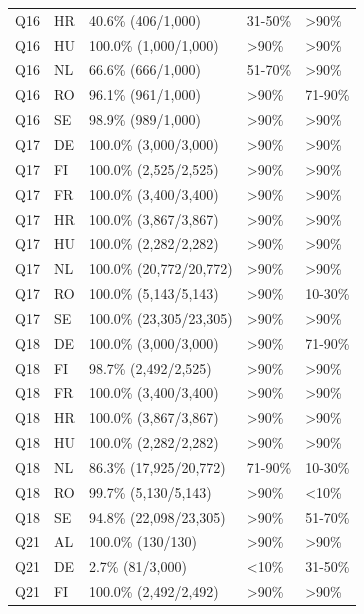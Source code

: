 {\begin{longtable}[]{@{}
  L{0.1274}
  L{0.1177}
  L{0.3333}
  L{0.1470}
  L{0.2745}@{}}
Q16 & HR & 40.6\% (406/1,000) & 31-50\% & \textgreater90\% \\
Q16 & HU & 100.0\% (1,000/1,000) & \textgreater90\% & \textgreater90\% \\
Q16 & NL & 66.6\% (666/1,000) & 51-70\% & \textgreater90\% \\
Q16 & RO & 96.1\% (961/1,000) & \textgreater90\% & 71-90\% \\
Q16 & SE & 98.9\% (989/1,000) & \textgreater90\% & \textgreater90\% \\
Q17 & DE & 100.0\% (3,000/3,000) & \textgreater90\% & \textgreater90\% \\
Q17 & FI & 100.0\% (2,525/2,525) & \textgreater90\% & \textgreater90\% \\
Q17 & FR & 100.0\% (3,400/3,400) & \textgreater90\% & \textgreater90\% \\
Q17 & HR & 100.0\% (3,867/3,867) & \textgreater90\% & \textgreater90\% \\
Q17 & HU & 100.0\% (2,282/2,282) & \textgreater90\% & \textgreater90\% \\
Q17 & NL & 100.0\% (20,772/20,772) & \textgreater90\% & \textgreater90\% \\
Q17 & RO & 100.0\% (5,143/5,143) & \textgreater90\% & 10-30\% \\
Q17 & SE & 100.0\% (23,305/23,305) & \textgreater90\% & \textgreater90\% \\
Q18 & DE & 100.0\% (3,000/3,000) & \textgreater90\% & 71-90\% \\
Q18 & FI & 98.7\% (2,492/2,525) & \textgreater90\% & \textgreater90\% \\
Q18 & FR & 100.0\% (3,400/3,400) & \textgreater90\% & \textgreater90\% \\
Q18 & HR & 100.0\% (3,867/3,867) & \textgreater90\% & \textgreater90\% \\
Q18 & HU & 100.0\% (2,282/2,282) & \textgreater90\% & \textgreater90\% \\
Q18 & NL & 86.3\% (17,925/20,772) & 71-90\% & 10-30\% \\
Q18 & RO & 99.7\% (5,130/5,143) & \textgreater90\% & \textless10\% \\
Q18 & SE & 94.8\% (22,098/23,305) & \textgreater90\% & 51-70\% \\
Q21 & AL & 100.0\% (130/130) & \textgreater90\% & \textgreater90\% \\
Q21 & DE & 2.7\% (81/3,000) & \textless10\% & 31-50\% \\
Q21 & FI & 100.0\% (2,492/2,492) & \textgreater90\% & \textgreater90\% \\

\end{longtable}}
